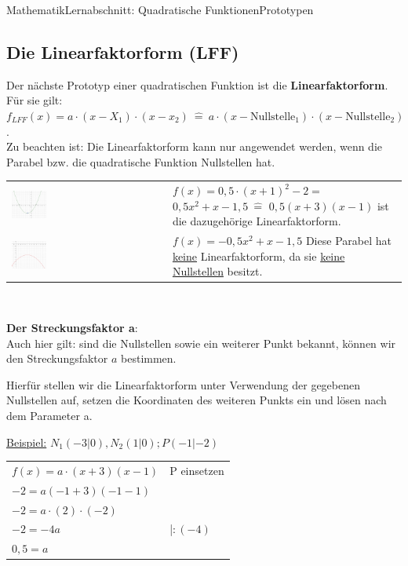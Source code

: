 \documentclass[11pt,twocolumn,oneside,openany,headings=optiontotoc,11pt,numbers=noenddot]{article}
\begin{document}
\begin{worksheet}{Mathematik}{Lernabschnitt: Quadratische Funktionen}{Prototypen}
		\subsection*{Die Linearfaktorform (LFF)}
		Der nächste Prototyp einer quadratischen Funktion ist die \textbf{Linearfaktorform}. Für sie gilt: \(f_{LFF}(x) = a\cdot(x-X_1)\cdot(x-x_2)\ \hat{=}\ a\cdot(x-\text{Nullstelle}_1)\cdot(x-\text{Nullstelle}_2)\).\\
		Zu beachten ist: Die Linearfaktorform kann nur angewendet werden, wenn die Parabel bzw. die quadratische Funktion Nullstellen hat.\\
		\par\noindent
		\begin{tabularx}{0.5\textwidth}{XX}
			\includegraphics[width=0.23\textwidth,align=t]{../99_Bilder/LFF_Y.png} & \(f(x) = 0,5\cdot(x+1)^2 -2 =\) \(0,5x^2 +x -1,5\ \hat{=}\) \colorbox{green!10}{\(0,5(x+3)(x-1)\)} ist die dazugehörige Linearfaktorform.\\
			\includegraphics[width=0.23\textwidth,align=t]{../99_Bilder/LFF_N.png} & \(f(x) = -0,5x^2 +x -1,5\) Diese Parabel hat \underline{keine} Linearfaktorform, da sie \underline{keine Nullstellen} besitzt.\\
		\end{tabularx}\\
		\par\noindent
		\textbf{Der Streckungsfaktor a}:\\
		Auch hier gilt: sind die Nullstellen sowie ein weiterer Punkt bekannt, können wir den Streckungsfaktor \(a\) bestimmen.\\
		\par\noindent
		Hierfür stellen wir die Linearfaktorform unter Verwendung der gegebenen Nullstellen auf, setzen die Koordinaten des weiteren Punkts ein und lösen nach dem Parameter a.\\
		\par\noindent
		\underline{Beispiel:} \(N_1(-3|0), N_2(1|0); P(-1|-2)\)\\
		\begin{tabularx}{0.5\textwidth}{ll}
			\(f(x) = a\cdot(x+3)(x-1)\) & P einsetzen\\
			\(-2 = a(-1+3)(-1-1)\)\\
			\(-2 = a\cdot(2)\cdot(-2)\)\\
			\(-2 = -4a\) & |\(:(-4)\)\\
			\(0,5 = a\)
		\end{tabularx}

\end{worksheet}
\end{document}
